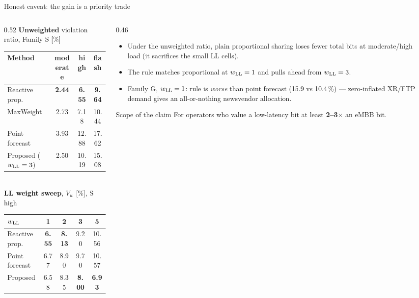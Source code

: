 \documentclass[aspectratio=169,11pt,xcolor=table]{beamer}
\newcommand{\best}[1]{\textbf{\textcolor{good}{#1}}}
\begin{document}
\begin{frame}{Honest caveat: the gain is a priority trade}
  \begin{columns}[T]
    \begin{column}{0.52\textwidth}
      \textbf{Unweighted} violation ratio, Family S [\%]\\[2pt]
      \scriptsize
      \begin{tabular}{lccc}
        \toprule
        Method & moderate & high & flash \\
        \midrule
        Reactive prop. & \best{2.44} & \best{6.55} & \best{9.64} \\
        MaxWeight & 2.73 & 7.18 & 10.44 \\
        Point forecast & 3.93 & 12.88 & 17.62 \\
        Proposed ($w_{\rm LL}=3$) & 2.50 & 10.19 & 15.08 \\
        \bottomrule
      \end{tabular}\\[6pt]
      \normalsize
      \textbf{LL weight sweep}, $V_w$ [\%], S high\\[2pt]
      \scriptsize
      \begin{tabular}{lcccc}
        \toprule
        $w_{\rm LL}$ & 1 & 2 & 3 & 5 \\
        \midrule
        Reactive prop. & \best{6.55} & \best{8.13} & 9.20 & 10.56 \\
        Point forecast & 6.77 & 8.90 & 9.70 & 10.57 \\
        Proposed & 6.58 & 8.35 & \best{8.00} & \best{6.93} \\
        \bottomrule
      \end{tabular}
    \end{column}
    \begin{column}{0.46\textwidth}
      \begin{itemize}\small
        \item Under the unweighted ratio, plain proportional sharing loses fewer total bits at moderate/high load (it sacrifices the small LL cells).
        \item The rule matches proportional at $w_{\rm LL}=1$ and pulls ahead from $w_{\rm LL}=3$.
        \item Family G, $w_{\rm LL}=1$: rule is \emph{worse} than point forecast (15.9 vs 10.4\,\%) --- zero-inflated XR/FTP demand gives an all-or-nothing newsvendor allocation.
      \end{itemize}
      \begin{alertblock}{Scope of the claim}
        \small For operators who value a low-latency bit at least \textbf{2--3$\times$} an eMBB bit.
      \end{alertblock}
    \end{column}
  \end{columns}
\end{frame}
\end{document}
